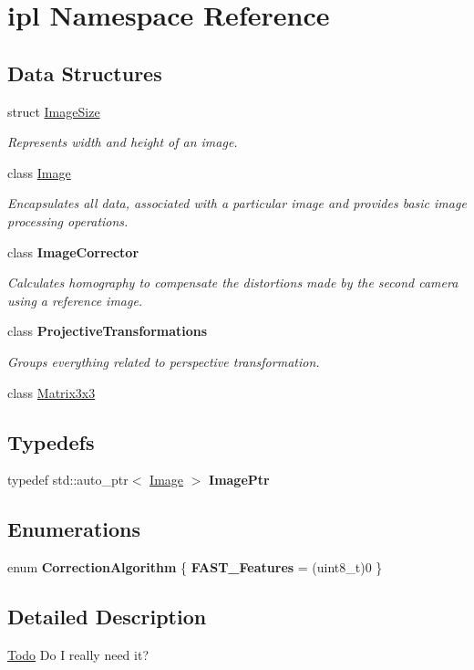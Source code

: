 \hypertarget{namespaceipl}{
\section{ipl Namespace Reference}
\label{namespaceipl}
}
\subsection*{Data Structures}
\begin{DoxyCompactItemize}
\item 
struct \hyperlink{structipl_1_1ImageSize}{ImageSize}
\begin{DoxyCompactList}\small\item\em Represents width and height of an image. \end{DoxyCompactList}\item 
class \hyperlink{classipl_1_1Image}{Image}
\begin{DoxyCompactList}\small\item\em Encapsulates all data, associated with a particular image and provides basic image processing operations. \end{DoxyCompactList}\item 
class {\bfseries ImageCorrector}
\begin{DoxyCompactList}\small\item\em Calculates homography to compensate the distortions made by the second camera using a reference image. \end{DoxyCompactList}\item 
class {\bfseries ProjectiveTransformations}
\begin{DoxyCompactList}\small\item\em Groups everything related to perspective transformation. \end{DoxyCompactList}\item 
class \hyperlink{classipl_1_1Matrix3x3}{Matrix3x3}
\end{DoxyCompactItemize}
\subsection*{Typedefs}
\begin{DoxyCompactItemize}
\item 
\hypertarget{namespaceipl_a487eca73b8111bc641a2097a5c415ecf}{
typedef std::auto\_\-ptr$<$ \hyperlink{classipl_1_1Image}{Image} $>$ {\bfseries ImagePtr}}
\label{namespaceipl_a487eca73b8111bc641a2097a5c415ecf}

\end{DoxyCompactItemize}
\subsection*{Enumerations}
\begin{DoxyCompactItemize}
\item 
enum {\bfseries CorrectionAlgorithm} \{ {\bfseries FAST\_\-Features} =  (uint8\_\-t)0
 \}
\end{DoxyCompactItemize}


\subsection{Detailed Description}
\begin{Desc}
\item[\hyperlink{todo__todo000003}{Todo}]Do I really need it? \end{Desc}
